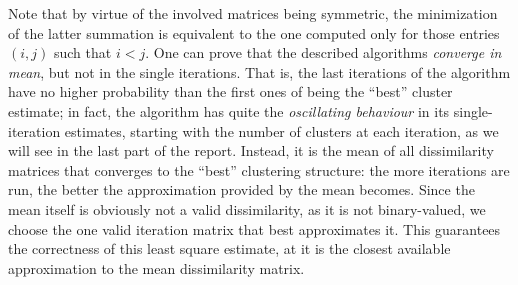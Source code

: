 Note that by virtue of the involved matrices being symmetric, the minimization of the latter summation is equivalent to the one computed only for those entries $(i,j)$ such that $i<j$.
One can prove that the described algorithms \emph{converge in mean}, but not in the single iterations.
That is, the last iterations of the algorithm have no higher probability than the first ones of being the ``best'' cluster estimate; in fact, the algorithm has quite the \emph{oscillating behaviour} in its single-iteration estimates, starting with the number of clusters at each iteration, as we will see in the last part of the report.
Instead, it is the mean of all dissimilarity matrices that converges to the ``best'' clustering structure: the more iterations are run, the better the approximation provided by the mean becomes.
Since the mean itself is obviously not a valid dissimilarity, as it is not binary-valued, we choose the one valid iteration matrix that best approximates it.
This guarantees the correctness of this least square estimate, at it is the closest available approximation to the mean dissimilarity matrix.




